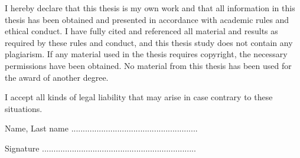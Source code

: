 \begin{legal}

I hereby declare that this thesis is my own work and that all information in this thesis has been obtained and presented in accordance with academic rules and ethical conduct. I have fully cited and referenced all material and results as required by these rules and conduct, and this thesis study does not contain any plagiarism. If any material used in the thesis requires copyright, the necessary permissions have been obtained. No material from this thesis has been used for the award of another degree.

I accept all kinds of legal liability that may arise in case contrary to these situations.

\begin{flushright}
Name, Last name    .......................................................
\end{flushright}
\begin{flushright}
Signature   ...................................................................
\end{flushright}

\end{legal}
